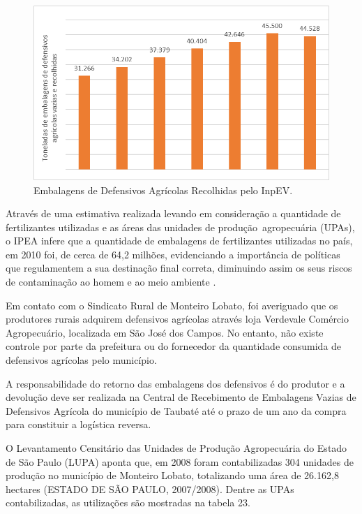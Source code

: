 	\begin{figure}
		\centering
		\includegraphics[width=0.75\linewidth]{produtos/prodtres/image080}
		\caption{Embalagens de Defensivos Agrícolas Recolhidas pelo InpEV.}
		\label{fig:image080}
	\end{figure}
	
	
	Através de uma estimativa realizada levando em consideração a quantidade de fertilizantes utilizadas e as áreas das unidades de produção agropecuária (UPAs), o IPEA infere que a quantidade de embalagens de fertilizantes utilizadas no país, em 2010 foi, de cerca de 64,2 milhões, evidenciando a importância de políticas que regulamentem a sua destinação final correta, diminuindo assim os seus riscos de contaminação ao homem e ao meio ambiente \cite{IPEA2013}.
	
	Em contato com o Sindicato Rural de Monteiro Lobato, foi averiguado que os produtores rurais adquirem defensivos agrícolas através loja Verdevale Comércio Agropecuário, localizada em São José dos Campos. No entanto, não existe controle por parte da prefeitura ou do fornecedor da quantidade consumida de defensivos agrícolas pelo município. 
	
	A responsabilidade do retorno das embalagens dos defensivos é do produtor e a devolução deve ser realizada na Central de Recebimento de Embalagens Vazias de Defensivos Agrícola do município de Taubaté até o prazo de um ano da compra para constituir a logística reversa.
	
	O Levantamento Censitário das Unidades de Produção Agropecuária do Estado de São Paulo (LUPA) aponta que, em 2008 foram contabilizadas 304 unidades de produção no município de Monteiro Lobato, totalizando uma área de 26.162,8 hectares (ESTADO DE SÃO PAULO, 2007/2008). Dentre as UPAs contabilizadas, as utilizações são mostradas na tabela 23.
	
	


